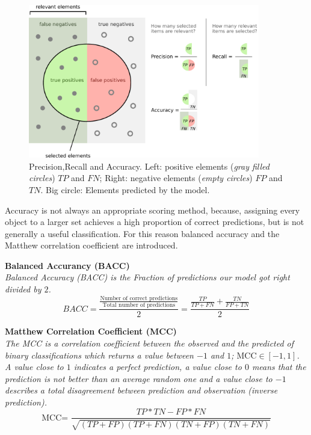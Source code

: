\begin{figure}[H]
\centering
\includegraphics[width=0.9\textwidth]{./Bilder/Precisionrecall.pdf}
\caption[Precision,Recall and Accuracy]{Precision,Recall and Accuracy. Left: positive elements (\textit{gray filled circles}) $TP$ and $FN$; Right: negative elements (\textit{empty circles}) $FP$ and $TN$. Big circle: Elements predicted by the model.}
\label{fig:Pipeline}
\end{figure} 


Accuracy is not always an appropriate scoring method, because, assigning every object to a larger set achieves a high proportion of correct predictions, but is not generally a useful classification. For this reason balanced accuracy and the Matthew correlation coefficient are introduced.

\newpage
\begin{defn}\textbf{Balanced Accurancy (BACC)}\\
\textit{Balanced Accuracy (BACC) is the Fraction of predictions our model got right divided by $2$.}
\begin{equation}
BACC=\frac{\frac{\text{Number of correct predictions}}{\text{Total number of predictions}}}{2}= \frac{\frac{TP}{TP+FN}+\frac{TN}{FP+TN}}{2}
\end{equation}
\end{defn}
\citep{Brodersen.23.08.201026.08.2010}


\begin{defn}\textbf{Matthew Correlation Coefficient (MCC)} \\
\textit{The MCC is a correlation coefficient between the observed and the predicted of binary classifications which returns a value between $-1$ and $1$; $\text{MCC}\in [-1,1]$. A value close to $1$ indicates a perfect prediction, a value close to $0$ means that the prediction is not better than an average random one and a value close to $-1$ describes a total disagreement between prediction and observation (inverse prediction). }
\begin{equation}
\text{MCC= }\frac{TP*TN-FP*FN}{\sqrt{(TP+FP)(TP+FN)(TN+FP)(TN+FN)}}
\end{equation}
\end{defn}
\citep{Boughorbel.2017}

